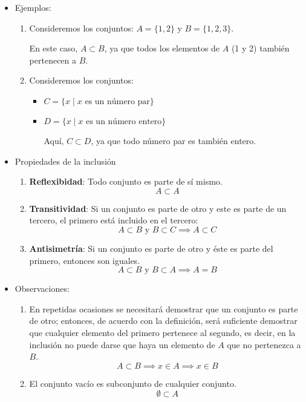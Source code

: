 \begin{itemize}
	
	\item Ejemplos:
	
	\begin{enumerate}
		\item Consideremos los conjuntos: \(A = \{1, 2\}\) y \(B = \{1, 2, 3\}\).
		
		En este caso, \(A \subset B\), ya que todos los elementos de \(A\) (1 y 2) también pertenecen a \(B\).
		
		\item Consideremos los conjuntos:
		
		\begin{itemize}
			\item \(C = \{x \mid x \mbox{ es un número par}\}\)
			\item \(D = \{x \mid x \mbox{ es un número entero}\}\)
			
			Aquí, \(C \subset D\), ya que todo número par es también entero.
		\end{itemize}
	\end{enumerate}
	
	\item Propiedades de la inclusión
	\begin{enumerate}[label=\roman*)]
		\item \textbf{Reflexibidad}: Todo conjunto es parte de sí mismo.
		\[ A \subset A \]
		\item \textbf{Transitividad}: Si un conjunto es parte de otro y este es parte de un tercero, el primero está incluido en el tercero:
		\[ A \subset B \mbox{ y } B \subset C \implies A \subset C \]
		\item \textbf{Antisimetría}: Si un conjunto es parte de otro y éste es parte del primero, entonces son iguales.
		\[ A \subset B \mbox{ y } B \subset A \implies A = B \]
	\end{enumerate}
	
	\item Observaciones:
	
	\begin{enumerate}
		\item En repetidas ocasiones se necesitará demostrar que un conjunto es parte de otro; entonces, de acuerdo con la definición, será suficiente demostrar que cualquier elemento del primero pertenece al segundo, es decir, en la inclusión no puede darse que haya un elemento de $A$ que no pertenezca a $B$.
		\[ A \subset B \implies x \in A \implies x \in B \]
		
		\item El conjunto vacío es subconjunto de cualquier conjunto.
		\[ \emptyset \subset A \]
	\end{enumerate}
\end{itemize}

